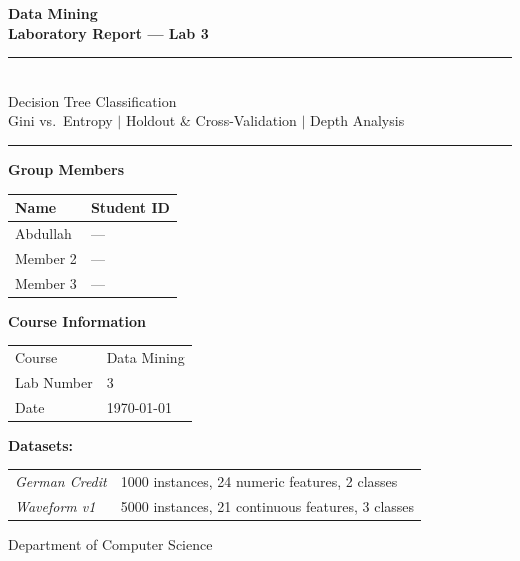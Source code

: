 \documentclass[12pt,a4paper]{article}
\begin{document}
\begin{titlepage}
\centering
\vspace*{2cm}

{\Huge\bfseries\color{myblue} Data Mining}\\[0.4cm]
{\LARGE\bfseries Laboratory Report --- Lab 3}\\[0.3cm]
\rule{\linewidth}{0.5pt}\\[0.5cm]
{\Large Decision Tree Classification}\\[0.2cm]
{\large Gini vs.\ Entropy $\mid$ Holdout \& Cross-Validation $\mid$ Depth Analysis}\\[0.5cm]
\rule{\linewidth}{0.5pt}

\vspace{1.5cm}

{\large\bfseries Group Members}\\[0.5cm]
\begin{tabular}{@{}ll@{}}
\toprule
\textbf{Name} & \textbf{Student ID} \\
\midrule
Abdullah & --- \\
Member 2 & --- \\
Member 3 & --- \\
\bottomrule
\end{tabular}

\vspace{1.5cm}

{\large\bfseries Course Information}\\[0.5cm]
\begin{tabular}{@{}ll@{}}
Course     & Data Mining \\
Lab Number & 3 \\
Date       & \today \\
\end{tabular}

\vspace{2cm}

\textbf{Datasets:}\\[0.3cm]
\begin{tabular}{@{}ll@{}}
\textit{German Credit}  & 1000 instances, 24 numeric features, 2 classes \\
\textit{Waveform v1}    & 5000 instances, 21 continuous features, 3 classes \\
\end{tabular}

\vfill
{\small Department of Computer Science}
\end{titlepage}
\end{document}
